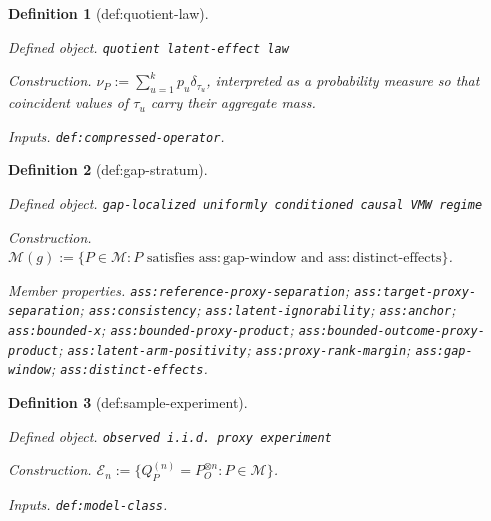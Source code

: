 \documentclass{article}
\newtheorem{definition}{Definition}
\begin{document}
\begin{definition}[def:quotient-law]\label{def:quotient-law}
\par\smallskip\noindent\emph{Defined object.} \texttt{quotient latent-\allowbreak{}effect law}
\par\smallskip\noindent\emph{Construction.} \(\nu_P:=\sum_{u=1}^{k}p_u\delta_{\tau_u}\), interpreted as a probability measure so that coincident values of \(\tau_u\) carry their aggregate mass.
\par\smallskip\noindent\emph{Inputs.} \texttt{def:\allowbreak{}compressed-\allowbreak{}operator}.
\end{definition}

\begin{definition}[def:gap-stratum]\label{def:gap-stratum}
\par\smallskip\noindent\emph{Defined object.} \texttt{gap-\allowbreak{}localized uniformly conditioned causal VMW regime}
\par\smallskip\noindent\emph{Construction.} \(\mathcal M(g):=\{P\in\mathcal M:P\text{ satisfies }\mathrm{ass:gap\text{-}window}\text{ and }\mathrm{ass:distinct\text{-}effects}\}\).
\par\smallskip\noindent\emph{Member properties.} \texttt{ass:\allowbreak{}reference-\allowbreak{}proxy-\allowbreak{}separation}; \texttt{ass:\allowbreak{}target-\allowbreak{}proxy-\allowbreak{}separation}; \texttt{ass:\allowbreak{}consistency}; \texttt{ass:\allowbreak{}latent-\allowbreak{}ignorability}; \texttt{ass:\allowbreak{}anchor}; \texttt{ass:\allowbreak{}bounded-\allowbreak{}x}; \texttt{ass:\allowbreak{}bounded-\allowbreak{}proxy-\allowbreak{}product}; \texttt{ass:\allowbreak{}bounded-\allowbreak{}outcome-\allowbreak{}proxy-\allowbreak{}product}; \texttt{ass:\allowbreak{}latent-\allowbreak{}arm-\allowbreak{}positivity}; \texttt{ass:\allowbreak{}proxy-\allowbreak{}rank-\allowbreak{}margin}; \texttt{ass:\allowbreak{}gap-\allowbreak{}window}; \texttt{ass:\allowbreak{}distinct-\allowbreak{}effects}.
\end{definition}

\begin{definition}[def:sample-experiment]\label{def:sample-experiment}
\par\smallskip\noindent\emph{Defined object.} \texttt{observed i.i.d. proxy experiment}
\par\smallskip\noindent\emph{Construction.} \(\mathcal E_n:=\{Q_P^{(n)}=P_O^{\otimes n}:P\in\mathcal M\}\).
\par\smallskip\noindent\emph{Inputs.} \texttt{def:\allowbreak{}model-\allowbreak{}class}.
\end{definition}
\end{document}
